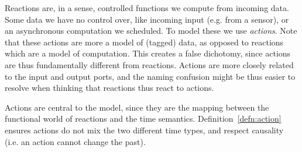 Reactions are, in a sense, controlled functions we compute from incoming data. 
Some data we have no control over, like incoming input (e.g. from a sensor), or an asynchronous computation we scheduled.
To model these we use \emph{actions}.
Note that these actions are more a model of (tagged) data, as opposed to reactions which are a model of computation.
This creates a false dichotomy, since actions are thus fundamentally different from reactions.
Actions are more closely related to the input and output ports, and the naming confusion might be thus easier to resolve when thinking that reactions thus react to actions.

Actions are central to the model, since they are the mapping between the functional world of reactions and the time semantics. 
Definition~\ref{defn:action} ensures actions do not mix the two different time types, and respect causality (i.e. an action cannot change the past).

